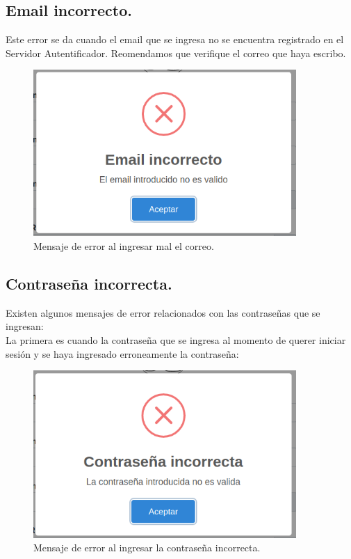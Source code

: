 \documentclass[12pt, a4paper, titlepage]{report}
\begin{document}
        \subsection{Email incorrecto.}
        Este error se da cuando el email que se ingresa no se encuentra registrado en el Servidor Autentificador. Reomendamos que verifique el correo que haya escribo.
        \begin{figure}[H]
            \centering
            \includegraphics[width=10cm]{imagenes/Registro/emailIncorrecto.png}
            \caption{Mensaje de error al ingresar mal el correo.}
            \label{fig:emailIncorrecto}
        \end{figure}
        
        \subsection{Contraseña incorrecta.}
        Existen algunos mensajes de error relacionados con las contraseñas que se ingresan:\\
        
        La primera es cuando la contraseña que se ingresa al momento de querer iniciar sesión y se haya ingresado erroneamente la contraseña: 
        \begin{figure}[H]
            \centering
            \includegraphics[width=10cm]{imagenes/Registro/contraseniaIncorrecta.png}
            \caption{Mensaje de error al ingresar la contraseña incorrecta.}
            \label{fig:contraseniaIncorrecta}
        \end{figure}
        
\end{document}
